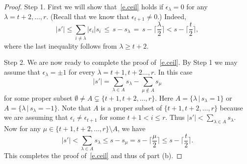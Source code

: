 \documentclass{amsproc}
\theoremstyle{definition}
\theoremstyle{remark}
\numberwithin{equation}{section}
\begin{document}
\begin{proof}
Step 1. First we will show that~\eqref{e.ceil} holds if $\epsilon_{\lambda} = 0$ for any $\lambda = t+2, \ldots, r$.
(Recall that we know that $\epsilon_{t +1} \neq 0$.) Indeed,
\[  |s'| \leqslant \sum_{i \neq \lambda} |\epsilon_i| s_i   
 \,   \leqslant \, s - s_{\lambda}  \,  = \,  s -  \lceil \frac{\lambda}{2} \rceil < s - \lceil \frac{t}{2} \rceil, \]
where the last inequality follows from $\lambda \geqslant t + 2$.

Step 2. We are now ready to complete the proof of~\eqref{e.ceil}. By Step 1 we
may assume that $\epsilon_{\lambda} = \pm 1$ for every $\lambda = t + 1, t + 2 \ldots, r$. In this case
\[ |s'| = \sum_{\lambda \in A} s_{\lambda} - \sum_{\mu \not \in A} s_{\mu} \]
 for some proper subset $\emptyset \neq A \subsetneq \{ t+1, t+2, \ldots, r \}$. Here $A = \{ \lambda \, | \, s_{\lambda} = 1 \}$
or $A = \{ \lambda \, | \, s_{\lambda} = -1 \}$. Note that $A$ is a proper subset of $\{ t + 1, t + 2, \ldots, r \}$
because we are assuming that $\epsilon_i\neq \epsilon_{t+1}$ for some $t+1<i\leqslant r$. 
Thus $\displaystyle |s'| < \sum_{\lambda \in A} s_{\lambda}$. Now for any $\mu \in \{ t+1, t + 2, \ldots, r \} \setminus A$, we have
\[ |s'| < \sum_{\lambda \in A} s_{\lambda} \leqslant s - s_{\mu} = 
s - \lceil \frac{\mu}{2} \rceil \leqslant s - \lceil \frac{t}{2} \rceil . \]
This completes the proof of~\eqref{e.ceil} and thus of part (b).

\end{proof}
\end{document}
